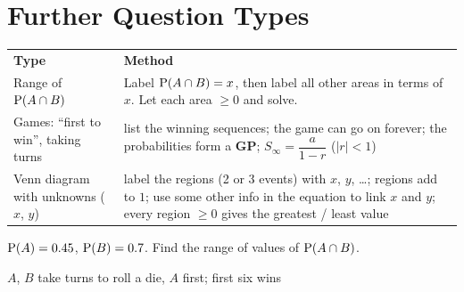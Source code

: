 \section{Further Question Types}
\begin{center}\renewcommand{\arraystretch}{1.08}\footnotesize
\begin{tabular}{|L{4.6cm}|L{10.6cm}|}\hline
\textbf{Type} & \textbf{Method}\\\Xhline{2pt}
Range of $\mathrm{P}(A\cap B)$ & Label $\mathrm{P}(A\cap B)=x$, then label all other areas in terms of $x$. Let each area $\geqslant0$ and solve.\\\hline
Games: ``first to win'', taking turns & list the winning sequences; the game can go on forever; the probabilities form a \textbf{GP}; $S_{\infty}=\dfrac{a}{1-r}$ ($|r|<1$)\\\hline
Venn diagram with unknowns ($x$, $y$) & label the regions (2 or 3 events) with $x$, $y$, \ldots; regions add to $1$; use some other info in the equation to link $x$ and $y$; every region $\geqslant0$ gives the greatest / least value\\\hline
\end{tabular}\end{center}
\noindent\begin{minipage}[t]{0.48\textwidth}
\exlab $\mathrm{P}(A)=0.45$, $\mathrm{P}(B)=0.7$. Find the range of values of $\mathrm{P}(A\cap B)$.
\end{minipage}\hfill
\begin{minipage}[t]{0.48\textwidth}
\exlab $A$, $B$ take turns to roll a die, $A$ first; first six wins
\end{minipage}
